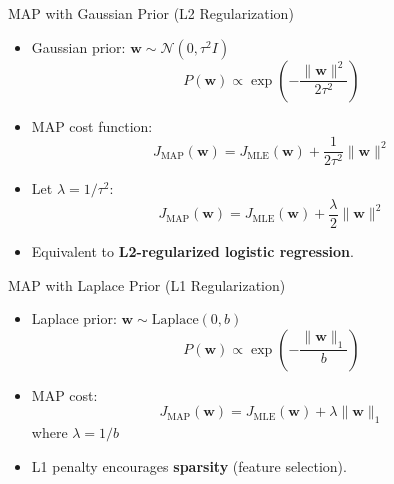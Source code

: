 \documentclass[serif, aspectratio=169]{beamer}
\begin{document}
    \begin{frame}{MAP with Gaussian Prior (L2 Regularization)}
        \begin{itemize}
            \item Gaussian prior: $\mathbf{w} \sim \mathcal{N}(0, \tau^2 I)$
            \[
                P(\mathbf{w}) \propto \exp\left(-\frac{\|\mathbf{w}\|^2}{2\tau^2}\right)
            \]
            \item MAP cost function:
            \[
                J_{\text{MAP}}(\mathbf{w}) = J_{\text{MLE}}(\mathbf{w}) + \frac{1}{2\tau^2}\|\mathbf{w}\|^2
            \]
            \item Let $\lambda = 1/\tau^2$:
            \[
                J_{\text{MAP}}(\mathbf{w}) = J_{\text{MLE}}(\mathbf{w}) + \frac{\lambda}{2}\|\mathbf{w}\|^2
            \]
            \item Equivalent to \textbf{L2-regularized logistic regression}.
        \end{itemize}
    \end{frame}

    \begin{frame}{MAP with Laplace Prior (L1 Regularization)}
        \begin{itemize}
            \item Laplace prior: $\mathbf{w} \sim \text{Laplace}(0, b)$
            \[
                P(\mathbf{w}) \propto \exp\left(-\frac{\|\mathbf{w}\|_1}{b}\right)
            \]
            \item MAP cost:
            \[
                J_{\text{MAP}}(\mathbf{w}) = J_{\text{MLE}}(\mathbf{w}) + \lambda \|\mathbf{w}\|_1
            \]
            where $\lambda = 1/b$
            \item L1 penalty encourages \textbf{sparsity} (feature selection).
        \end{itemize}
    \end{frame}
\end{document}

